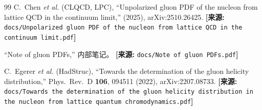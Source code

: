 \documentclass[12pt,a4paper]{ctexart}
\theoremstyle{definition}
\begin{document}
\begin{thebibliography}{99}
C.~Chen \textit{et al.} (CLQCD, LPC),
``Unpolarized gluon PDF of the nucleon from lattice QCD in the continuum limit,''
(2025), arXiv:2510.26425.
\quad\textbf{[来源:} \texttt{docs/Unpolarized gluon PDF of the nucleon from lattice QCD in the continuum limit.pdf}\textbf{]}

``Note of gluon PDFs,'' 内部笔记。
\quad\textbf{[来源:} \texttt{docs/Note of gluon PDFs.pdf}\textbf{]}

C.~Egerer \textit{et al.} (HadStruc),
``Towards the determination of the gluon helicity distribution,''
Phys.\ Rev.\ D \textbf{106}, 094511 (2022), arXiv:2207.08733.
\quad\textbf{[来源:} \texttt{docs/Towards the determination of the gluon helicity distribution in the nucleon from lattice quantum chromodynamics.pdf}\textbf{]}

\end{thebibliography}
\end{document}
